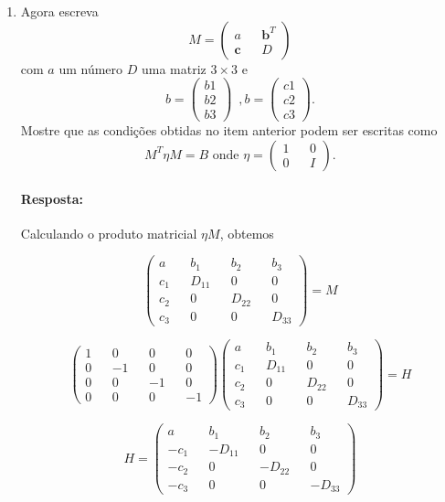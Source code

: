 \documentclass[10pt,a4paper]{article}
\begin{document}
\begin{enumerate}
	\item Agora escreva
	\begin{equation}\nonumber
		M =\left(\begin{matrix}
			a && \mathbf{b}^{T} \\
			\mathbf{c} && D
		\end{matrix}\right)
	\end{equation}
com $ a $ um número $ D $ uma matriz $ 3 \times 3 $ e
\begin{equation}\nonumber
	b = \left(\begin{matrix}
		b1 \\
		b2 \\
		b3
	\end{matrix}\right) \,\,\, ,	b = \left(\begin{matrix}
	c1 \\
	c2 \\
	c3
\end{matrix}\right).
\end{equation}
Mostre que as condições obtidas no item anterior podem ser escritas como
\begin{equation}\nonumber
	M^T\eta M = B \text{   onde } \eta = \left( \begin{matrix}
		1 && 0 \\
		0 && I
	\end{matrix}\right).
\end{equation}
\paragraph{Resposta:}
Calculando o produto matricial $ \eta M $, obtemos

\begin{equation}\nonumber
	\left(\begin{matrix}
		a && b_1 && b_2 && b_3 \\
		c_1 && D_{11} && 0 && 0 \\
		c_2 && 0 && D_{22} && 0 \\
		c_3 && 0 && 0 && D_{33}
	\end{matrix}\right) = M
\end{equation}

\begin{equation}\nonumber
	\left(\begin{matrix}
		1 && 0 && 0 && 0 \\
		0 && -1 && 0 && 0 \\
		0 && 0 && -1 && 0 \\
		0 && 0 && 0 && -1
	\end{matrix}\right)
	\left(\begin{matrix}
		a && b_1 && b_2 && b_3 \\
		c_1 && D_{11} && 0 && 0 \\
		c_2 && 0 && D_{22} && 0 \\
		c_3 && 0 && 0 && D_{33}
	\end{matrix}\right) = H
\end{equation}

$$H = 	\left(\begin{matrix}
	a && b_1 && b_2 && b_3 \\
	-c_1 && -D_{11} && 0 && 0 \\
	-c_2 && 0 && -D_{22} && 0 \\
	-c_3 && 0 && 0 && -D_{33}
\end{matrix}\right)$$
\end{enumerate}
	
\end{document}
